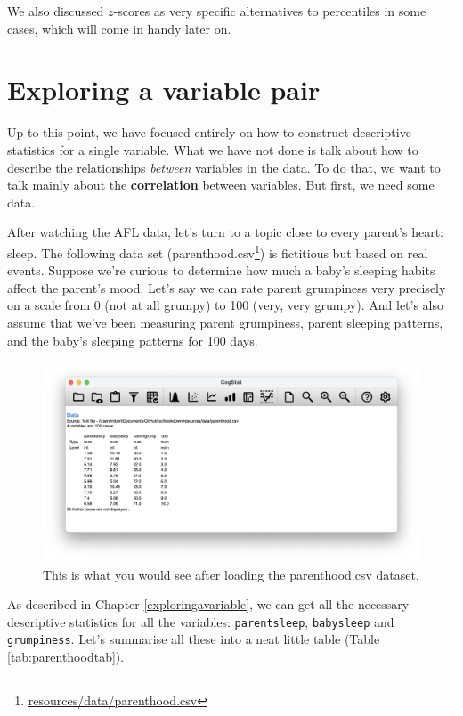 \documentclass[
  11pt,
  a4paper,
  twoside,symmetric,openright]{book}
\theoremstyle{break}
\theoremstyle{break}
\DeclareRobustCommand{\href}[2]{#2\footnote{\url{#1}}}
\begin{document}
We also discussed \(z\)-scores as very specific alternatives to percentiles in some cases, which will come in handy later on.

\chapter{Exploring a variable pair}\label{correl}

Up to this point, we have focused entirely on how to construct descriptive statistics for a single variable. What we have not done is talk about how to describe the relationships \emph{between} variables in the data. To do that, we want to talk mainly about the \textbf{correlation} between variables. But first, we need some data.

After watching the AFL data, let's turn to a topic close to every parent's heart: sleep. The following data set (\href{resources/data/parenthood.csv}{parenthood.csv}) is fictitious but based on real events. Suppose we're curious to determine how much a baby's sleeping habits affect the parent's mood. Let's say we can rate parent grumpiness very precisely on a scale from 0 (not at all grumpy) to 100 (very, very grumpy). And let's also assume that we've been measuring parent grumpiness, parent sleeping patterns, and the baby's sleeping patterns for 100 days.

\begin{figure}

{\centering \includegraphics[width=0.6\linewidth]{resources/image/cogstatparenthoodload} 

}

\caption{This is what you would see after loading the parenthood.csv dataset.}\label{fig:loadparenthood}
\end{figure}

As described in Chapter \ref{exploringavariable}, we can get all the necessary descriptive statistics for all the variables: \texttt{parentsleep}, \texttt{babysleep} and \texttt{grumpiness}. Let's summarise all these into a neat little table (Table \ref{tab:parenthoodtab}).
\end{document}
